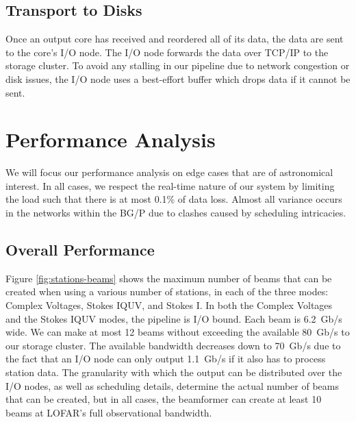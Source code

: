 \documentclass{llncs}
\begin{document}
\subsection{Transport to Disks}
Once an output core has received and reordered all of its data, the data are sent to the core's I/O node. The I/O node forwards the data over TCP/IP to the storage cluster. To avoid any stalling in our pipeline due to network congestion or disk issues, the I/O node uses a best-effort buffer which drops data if it cannot be sent.


\section{Performance Analysis}

We will focus our performance analysis on edge cases that are of astronomical interest. In all cases, we respect the real-time nature of our system by limiting the load such that there is at most 0.1\% of data loss. Almost all variance occurs in the networks within the BG/P due to clashes caused by scheduling intricacies.

\subsection{Overall Performance}

Figure \ref{fig:stations-beams} shows the maximum number of beams that can be created when using a various number of stations, in each of the three modes: Complex Voltages, Stokes IQUV, and Stokes I. In both the Complex Voltages and the Stokes IQUV modes, the pipeline is I/O bound. Each beam is 6.2~Gb/s wide. We can make at most 12 beams without exceeding the available 80~Gb/s to our storage cluster. The available bandwidth decreases down to 70~Gb/s due to the fact that an I/O node can only output 1.1~Gb/s if it also has to process station data. The granularity with which the output can be distributed over the I/O nodes, as well as scheduling details, determine the actual number of beams that can be created, but in all cases, the beamformer can create at least 10 beams at LOFAR's full observational bandwidth.
\end{document}

